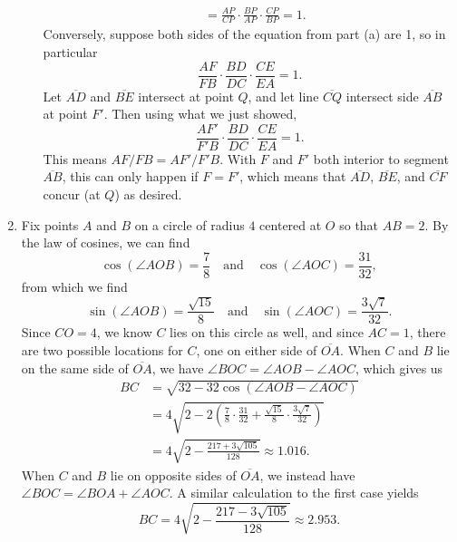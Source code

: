 \begin{enumerate}
\begin{enumerate}
\begin{align*}
&= \frac{AP}{CP}\cdot\frac{BP}{AP}\cdot\frac{CP}{BP} = 1.
\end{align*}
Conversely, suppose both sides of the equation from part (a) are 1, so in particular
\begin{equation*}
\frac{AF}{FB}\cdot\frac{BD}{DC}\cdot\frac{CE}{EA} = 1.
\end{equation*}
Let $\overline{AD}$ and $\overline{BE}$ intersect at point $Q$, and let line $\overline{CQ}$ intersect side $\overline{AB}$ at point $F'$. Then using what we just showed,
\begin{equation*}
\frac{AF'}{F'B}\cdot\frac{BD}{DC}\cdot\frac{CE}{EA} = 1.
\end{equation*}
This means $AF/FB = AF'/F'B$. With $F$ and $F'$ both interior to segment $\overline{AB}$, this can only happen if $F = F'$, which means that $\overline{AD}$, $\overline{BE}$, and $\overline{CF}$ concur (at $Q$) as desired.
\end{enumerate}
\item Fix points $A$ and $B$ on a circle of radius $4$ centered at $O$ so that $AB = 2$. By the law of cosines, we can find
\begin{equation*}
\cos(\angle AOB) = \frac{7}{8}\quad\text{and}\quad\cos(\angle AOC) = \frac{31}{32},
\end{equation*}
from which we find
\begin{equation*}
\sin(\angle AOB) = \frac{\sqrt{15}}{8}\quad\text{and}\quad\sin(\angle AOC) = \frac{3\sqrt{7}}{32}.
\end{equation*}
Since $CO = 4$, we know $C$ lies on this circle as well, and since $AC = 1$, there are two possible locations for $C$, one on either side of $\overline{OA}$. When $C$ and $B$ lie on the same side of $\overline{OA}$, we have $\angle BOC = \angle AOB - \angle AOC$, which gives us
\begin{align*}
BC &= \sqrt{32 - 32\cos(\angle AOB - \angle AOC)} \\
&= 4\sqrt{2 - 2\left(\frac{7}{8}\cdot\frac{31}{32} + \frac{\sqrt{15}}{8}\cdot\frac{3\sqrt{7}}{32}\right)} \\
&= 4\sqrt{2 - \frac{217 + 3\sqrt{105}}{128}}\approx 1.016.
\end{align*}
When $C$ and $B$ lie on opposite sides of $\overline{OA}$, we instead have $\angle BOC = \angle BOA + \angle AOC$. A similar calculation to the first case yields
\begin{equation*}
BC = 4\sqrt{2 - \frac{217 - 3\sqrt{105}}{128}}\approx 2.953.
\end{equation*}

\end{enumerate}
